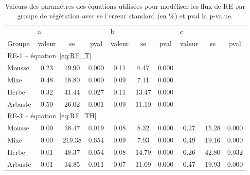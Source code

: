 \begin{table}
\centering
\caption{Valeurs des paramètres des équations utilisées pour modéliser les flux de RE par groupe de végétation avec se l'erreur standard (en \si{\percent}) et pval la p-value.}
\label{table:mdl_par_grp_veg_er}
\hspace*{-1cm}
\begin{tabular}{lccccccccc}\toprule
 & \multicolumn{3}{l}{a} & \multicolumn{3}{l}{b} & \multicolumn{3}{l}{c} \\  \cmidrule(lr){2-4} \cmidrule(lr){5-7} \cmidrule(lr){8-10}
Groupe & valeur & se & pval & valeur & se & pval & valeur & se & pval \\ \midrule
\multicolumn{10}{l}{RE-1 -- équation~\ref{eq:RE_T}}  \\ [+.5ex]
Mousse  & 0.23 & 19.90 & 0.000 & 0.11 &  6.47 & 0.000 & & & \\
Mixe    & 0.48 & 18.80 & 0.000 & 0.09 &  7.11 & 0.000 & & & \\
Herbe   & 0.32 & 41.44 & 0.027 & 0.11 & 13.47 & 0.000 & & & \\
Arbuste & 0.50 & 26.02 & 0.001 & 0.09 & 11.10 & 0.000 & & & \\
\multicolumn{10}{l}{RE-3 -- équation~\ref{eq:RE_TH}}  \\ [+.5ex]
Mousse  & 0.00 &  38.47 & 0.019 & 0.08 &  8.32 & 0.000 & 0.27 & 15.28 & 0.000 \\ 
Mixe    & 0.00 & 219.38 & 0.654 & 0.09 &  7.93 & 0.000 & 0.49 & 19.16 & 0.000 \\
Herbe   & 0.01 &  48.37 & 0.054 & 0.08 & 14.79 & 0.000 & 0.26 & 42.80 & 0.032 \\
Arbuste & 0.01 &  34.85 & 0.011 & 0.07 & 11.09 & 0.000 & 0.47 & 19.93 & 0.000 \\
\bottomrule
\end{tabular}
\hspace*{-1cm}
\end{table}

